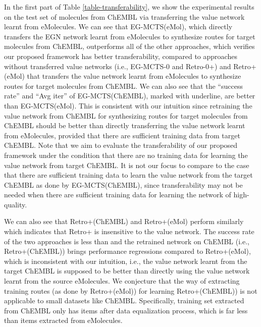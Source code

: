 \documentclass[sn-mathphys,Numbered]{sn-jnl}
\begin{document}
In the first part of Table \ref{table-transferability}, we show the experimental results on the test set of  molecules from ChEMBL via transferring the value network learnt from eMolecules. We can see that EG-MCTS(eMol), which directly transfers the EGN network learnt from eMolecules to synthesize routes for target molecules from ChEMBL, outperforms all of the other approaches, which verifies our proposed framework has better transferability, compared to approaches without transferred value networks (i.e., EG-MCTS-0 and Retro-0+) and Retro+(eMol) that transfers the value network learnt from eMolecules to synthesize routes for target molecules from ChEMBL. We can also see that the ``success rate'' and ``Avg iter'' of EG-MCTS(ChEMBL), marked with underline, are better than EG-MCTS(eMol). This is consistent with our intuition since retraining the value network from ChEMBL for synthesizing routes for target molecules from ChEMBL should be better than directly transferring the value network learnt from eMolecules, provided that there are sufficient training data from target ChEMBL. Note that we aim to evaluate the transferability of our proposed framework under the condition that there are no training data for learning the value network from target ChEMBL. It is not our focus to compare to the case that there are sufficient training data to learn the value network from the target ChEMBL as done by EG-MCTS(ChEMBL), since transferability may not be needed when there are sufficient training data for learning the network of high-quality. 


We can also see that Retro+(ChEMBL) and Retro+(eMol) perform similarly which indicates that Retro+ is insensitive to the value network.
The success rate of the two approaches is less than  and the retrained network on ChEMBL (i.e., Retro+(ChEMBL)) brings performance regressions compared to Retro+(eMol), which is inconsistent with our intuition, i.e., the value network learnt from the target ChEMBL is supposed to be better than directly using the value network learnt from the source eMolecules.
We conjecture that the way of extracting training routes (as done by Retro+(eMol)) for learning Retro+(ChEMBL)) is not applicable to small datasets like ChEMBL.
Specifically, training set extracted from ChEMBL only has  items after data equalization process, which is far less than  items extracted from eMolecules.
\end{document}
